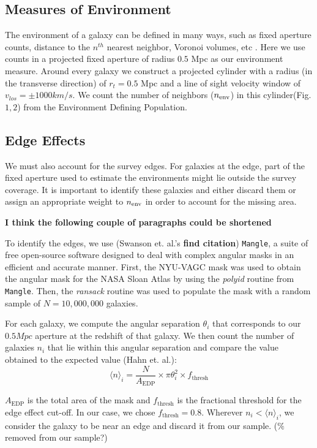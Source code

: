 \documentclass[iop]{emulateapj}
\begin{document}
\subsection{Measures of Environment}

The environment of a galaxy can be defined in many ways, such as 
fixed aperture counts, distance to the $n^{th}$ nearest neighbor, 
Voronoi volumes, etc \cite[]{Coop06}. Here we use counts in a 
projected fixed aperture of radius $0.5$ Mpc as our environment
measure. Around every galaxy we construct a projected cylinder
with a radius (in the transverse direction) of $r_{t} = 0.5$ 
Mpc and a line of sight velocity window of 
$v_{los} = \pm 1000 km/s$. We count the number of 
neighbors ($n_{\rm env}$) in this cylinder(Fig. $1,2$) from the Environment 
Defining Population.

\subsection{Edge Effects}\label{edge}

We must also account for the survey edges. For galaxies at the edge, 
part of the fixed aperture used to estimate the environments might 
lie outside the survey coverage. It is important to identify these
galaxies and either discard them or assign an appropriate weight to 
$n_{\rm env}$ in order to account for the missing area. 

\textbf{I think the following couple of paragraphs could be shortened}

To identify the edges, we use (Swanson et. al.'s \textbf{find citation}) 
\texttt{Mangle}, a suite of free open-source software designed 
to deal with complex angular masks in an efficient and accurate 
manner. First, the NYU-VAGC mask was used to obtain the angular 
mask for the NASA Sloan Atlas by using the \emph{polyid} 
routine from \texttt{Mangle}. Then, the \emph{ransack} 
routine was used to populate the mask with a random sample of 
$N = 10,000,000$ galaxies.

For each galaxy, we compute the angular separation 
$\theta_{i}$ that corresponds to our $0.5 Mpc$ aperture at 
the redshift of that galaxy. We then count the number of 
galaxies $n_{i}$ that lie within this angular separation 
and compare the value obtained to the expected value 
(Hahn et. al.): $$\big \langle n \big \rangle _{i} = 
\frac{N}{A_{\mathrm{EDP}}} \times \pi \theta_{i}^{2} 
\times f_{\mathrm{thresh}} $$

$A_{\mathrm{EDP}}$ is the total area of the mask and 
$f_{\mathrm{thresh}}$ is the fractional threshold for the 
edge effect cut-off. In our case, we chose $f_{\mathrm{thresh}} = 0.8$. 
Wherever $n_{i} < \big \langle n \big \rangle _{i} $, 
we consider the galaxy to be near an edge and discard it 
from our sample. ($\%$ removed from our sample?)
\end{document}
